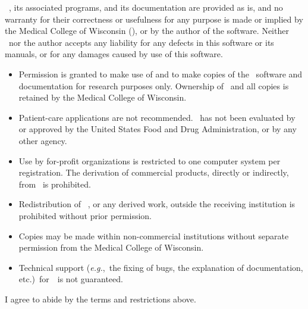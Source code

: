 \MCW$\!$~\afni, its associated programs, and its documentation are provided
as is, and no warranty for their correctness or usefulness for any
purpose is made or implied by the Medical College of Wisconsin (\MCW),
or by the author of the software.  Neither \MCW\ nor the author
accepts any liability for any
defects in this software or its manuals, or for any damages caused by use of this
software.

\begin{itemize}\vspace*{-4.9ex}\setlength{\parindent}{0em}\setlength{\parskip}{0.1ex}
   \item Permission is granted to make use of and to make copies of the
        \MCW$\!$~\afnit software and documentation for research
        purposes only.  Ownership of \MCW$\!$~\afnit and all copies is retained by the
        Medical College of Wisconsin.

   \item Patient-care applications are not recommended.  \MCW$\!$~\afnit has not
        been evaluated by or approved by the United States Food and Drug Administration,
        or by any other agency.

   \item Use by for-profit organizations is restricted to one computer system
         per registration.  The derivation of commercial products, directly
         or indirectly, from \MCW$\!$~\afnit is prohibited.

   \item Redistribution of \MCW$\!$~\afni, or any derived work, outside the receiving
        institution is prohibited without prior permission.

   \item Copies may be made within non-commercial institutions without separate
        permission from the Medical College of Wisconsin.

   \item Technical support ({\it e.g.},~the fixing of bugs, the explanation
         of documentation, etc.)\ for\ \MCW$\!$~\afnit is not guaranteed.
\end{itemize}
I agree to abide by the terms and restrictions above.\vspace{2ex}

